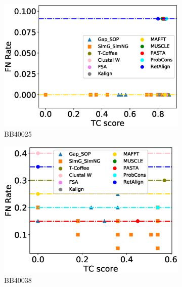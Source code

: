 \begin{figure}[!htbp]
\begin{adjustwidth}{-1.5cm}{-1cm}
\begin{subfigure}{0.22\textwidth}
			\includegraphics[width=\columnwidth]{Figure/summary/precomputedInit/Balibase/BB40025_fnrate_vs_tc_2}
			\caption{BB40025}
		\end{subfigure}
		\begin{subfigure}{0.22\textwidth}
			\includegraphics[width=\columnwidth]{Figure/summary/precomputedInit/Balibase/BB40038_fnrate_vs_tc_2}
			\caption{BB40038}
		\end{subfigure}	
		\begin{subfigure}{0.22\textwidth}

\end{subfigure}
\end{adjustwidth}
\end{figure}

